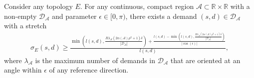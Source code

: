 \documentclass[acmsmall, screen]{acmart}
\begin{document}
\begin{theorem}
Consider any topology $E$. 
For any continuous, compact region $\mathcal{A} \subset \mathbb{R} \times \mathbb{R}$ with a non-empty $\mathcal{D}_\mathcal{A}$ and parameter $\epsilon \in [0, \pi)$, there exists a demand $(s,d) \in \mathcal{D}_\mathcal{A}$ with a stretch 
\begin{align}
\sigma_E(s,d) \geq \frac{ \min \left(l(s,d), \frac{R \lambda_\mathcal{A} (2\alpha(\mathcal{A}) \rho^2 + 1) \delta}{ |\mathcal{D}_\mathcal{A}|} \right)  + \frac{l(s,d) -   \min \left(l(s,d), \frac{R \lambda_\mathcal{A} (2\alpha(\mathcal{A}) \rho^2 + 1) \delta}{ |\mathcal{D}_\mathcal{A}|} \right)}{| \cos(\epsilon) |} }{ l(s,d) },
\end{align} 
where $\lambda_\mathcal{A}$ is the maximum number of demands in $\mathcal{D}_\mathcal{A}$ that are oriented at an angle within $\epsilon$ of any reference direction.   
\end{theorem}
\end{document}
